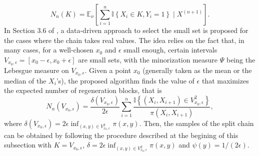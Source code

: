 \documentclass[sn-mathphys-ay]{sn-jnl}%
\newcommand{\smallSet}{K}
\begin{document}
\begin{appendices}
\begin{equation*}
    N_n(\smallSet)=\mathbb{E}_\nu\left[\sum_{i=1}^n \mathbb{I}\left\{X_i \in \smallSet, Y_i=1\right\} \mid X^{(n+1)}\right].
\end{equation*}
In Section 3.6 of \cite{Bertail2006}, a data-driven approach to select the small set is
proposed for the cases where the chain takes real values. The idea relies on the fact
that, in many cases, for a well-chosen $x_0$ and $\epsilon$ small enough, certain intervals
$V_{x_0,\epsilon}=[x_0-\epsilon,x_0+\epsilon]$ are small sets, with the minorization
measure $\Psi$ being the Lebesgue measure on $V_{x_0,\epsilon}$. Given a point $x_0$
(generally taken as the mean or the median of the $X_i$'s), the proposed algorithm finds
the value of $\epsilon$ that maximizes the expected number of regeneration blocks, that
is
\begin{equation*}
    N_n\left(V_{x_0,\epsilon}\right)=\frac{\delta\left(V_{x_0,\epsilon}\right)}{2\epsilon} \sum_{i=1}^n
    \frac{\mathbb{I}\left\{\left(X_i, X_{i+1}\right) \in V_{x_0,\epsilon}^2\right\}}{\pi\left(X_i, X_{i+1}\right)},
\end{equation*}
where $\delta\left(V_{x_0,\epsilon}\right)=2\epsilon\inf_{(x,y)\in V^2_{x_0,\epsilon}}\pi(x,y)$.
Then, the samples of the split chain can be obtained by following the procedure
described at the begining of this subsection with
$K=V_{x_0,\epsilon}$, $\delta=2\epsilon\inf_{(x,y)\in V^2_{x_0,\epsilon}}\pi(x,y)$
and $\psi(y)=1/(2\epsilon)$.

\end{appendices}
\end{document}
